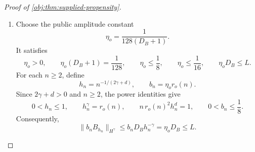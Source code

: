 \begin{proof}[Proof of \cref{obj:thm:supplied-propensity}]
\begin{enumerate}
We need a uniform Hölder bound after scaling. Define
\[
p_*=\lceil\gamma\rceil-1,
\qquad
s_o=\gamma-p_*,
\qquad
0\le p_*\le2,\quad 0<s_o\le1.
\]
Write the iterated derivatives as
\[
D^0B=B,\qquad D^{\iota_{\mathrm{der}}+1}B=D(D^{\iota_{\mathrm{der}}}B),
\qquad \iota_{\mathrm{der}}\in\mathbb N,
\]
and define their finite operator-norm bounds by
\[
C_{B,\iota_{\mathrm{der}}}=\sup_{w\in\mathbb R^d}\|D^{\iota_{\mathrm{der}}}B(w)\|,
\qquad \iota_{\mathrm{der}}\in\mathbb N.
\]
Their finiteness follows from continuity and compact support. Set
\[
A_B=\max\{C_{B,p_*},C_{B,p_*+1}\},
\qquad
M_B=2A_B.
\]
The derivative bound and the mean-value inequality give, for every \(w,w'\in\mathbb R^d\),
\[
\|D^{p_*}B(w)-D^{p_*}B(w')\|
\le A_B\|w-w'\|_2,
\qquad
\|D^{p_*}B(w)-D^{p_*}B(w')\|\le2A_B.
\]
If \(\|w-w'\|_2\le1\), use
\(\|w-w'\|_2\le\|w-w'\|_2^{s_o}\); if
\(\|w-w'\|_2>1\), use \(1\le\|w-w'\|_2^{s_o}\).
Thus both cases yield
\[
\|D^{p_*}B(w)-D^{p_*}B(w')\|
\le M_B\|w-w'\|_2^{s_o}.
\]

Translation and dilation satisfy
\[
D^{\iota_{\mathrm{der}}}B_h(x)=h^{-\iota_{\mathrm{der}}}D^{\iota_{\mathrm{der}}}B\bigl((x-x_0)/h\bigr).
\]
Evaluating these multilinear maps in coordinate directions gives the bounds
\[
|\partial^\kappa B_h(x)|
\le d^{\iota_{\mathrm{der}}} C_{B,\iota_{\mathrm{der}}}h^{-\iota_{\mathrm{der}}}
\qquad(|\kappa|=\iota_{\mathrm{der}}\le p_*),
\]
and
\[
|\partial^\kappa B_h(x)-\partial^\kappa B_h(x')|
\le d^{p_*}M_Bh^{-\gamma}\|x-x'\|_2^{s_o}
\qquad(|\kappa|=p_*).
\]
Here the dimension factors are valid because every coordinate direction has norm at most \(d\). Define
\[
S_B=\sum_{\iota_{\mathrm{der}}=0}^{p_*}d^{\iota_{\mathrm{der}}}C_{B,\iota_{\mathrm{der}}},
\qquad
D_B=S_B+d^{p_*}M_B+1.
\]
For \(0<h\le1\) and \(\iota_{\mathrm{der}}\le p_*<\gamma\), one has
\(h^{-\iota_{\mathrm{der}}}\le h^{-\gamma}\). Applying the norm definition in
\cref{obj:def:holder-norm} to the preceding derivative and modulus bounds proves
\[
D_B>0,
\qquad
\|B_h\|_{H^\gamma}\le D_Bh^{-\gamma}
\qquad(0<h\le1).
\]
This also covers the integer smoothness endpoints, where \(s_o=1\).

\item Choose the public amplitude constant
\[
\eta_o=\frac{1}{128(D_B+1)}.
\]
It satisfies
\[
\eta_o>0,\qquad
\eta_o(D_B+1)=\frac1{128},\qquad
\eta_o\le\frac18,\qquad
\eta_o\le\frac1{16},\qquad
\eta_oD_B\le L.
\]
For each \(n\ge2\), define
\[
h_n=n^{-1/(2\gamma+d)},
\qquad
b_n=\eta_o r_o(n).
\]
Since \(2\gamma+d>0\) and \(n\ge2\), the power identities give
\[
0<h_n\le1,
\qquad
h_n^\gamma=r_o(n),
\qquad
n\,r_o(n)^2h_n^d=1,
\qquad
0<b_n\le\frac18.
\]
Consequently,
\[
\|b_nB_{h_n}\|_{H^\gamma}
\le b_nD_Bh_n^{-\gamma}
=\eta_oD_B
\le L.
\]


\end{enumerate}
\end{proof}
